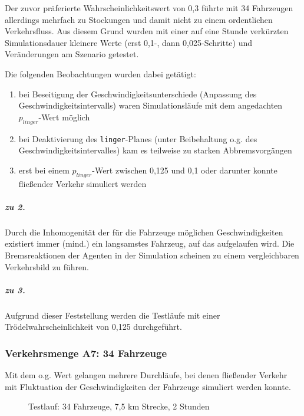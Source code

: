Der zuvor präferierte Wahrscheinlichkeitswert von 0,3 führte mit 34 Fahrzeugen allerdings mehrfach zu Stockungen und damit nicht zu einem ordentlichen Verkehrsfluss.
Aus diesem Grund wurden mit einer auf eine Stunde verkürzten Simulationsdauer kleinere Werte (erst 0,1-, dann 0,025-Schritte) und Veränderungen am Szenario getestet.

Die folgenden Beobachtungen wurden dabei getätigt:
\begin{enumerate}
	\itemsep0em
	\item bei Beseitigung der Geschwindigkeitsunterschiede (Anpassung des Geschwindigkeitsintervalls) waren Simulationsläufe mit dem angedachten $p_{linger}$-Wert möglich
	\item bei Deaktivierung des \texttt{linger}-Planes (unter Beibehaltung o.g. des Geschwindigkeitsintervalles) kam es teilweise zu starken Abbremsvorgängen
	\item erst bei einem $p_{linger}$-Wert zwischen 0,125 und 0,1 oder darunter konnte fließender Verkehr simuliert werden
\end{enumerate}

\subparagraph*{zu 2.} Durch die Inhomogenität der für die Fahrzeuge möglichen Geschwindigkeiten existiert immer (mind.) ein langsamstes Fahrzeug, auf das aufgelaufen wird.
Die Bremsreaktionen der Agenten in der Simulation scheinen zu einem vergleichbaren Verkehrsbild zu führen.

\subparagraph*{zu 3.} Aufgrund dieser Feststellung werden die Testläufe mit einer Trödelwahrscheinlichkeit von 0,125 durchgeführt.



\subsubsection{Verkehrsmenge A7: 34 Fahrzeuge}
\label{sec:szenario-a7}

Mit dem o.g. Wert gelangen mehrere Durchläufe, bei denen fließender Verkehr mit Fluktuation der Geschwindigkeiten der Fahrzeuge simuliert werden konnte.

\begin{figure}[hptb]
  \centering 
   \qquad 
  \caption{Testlauf: 34 Fahrzeuge, 7,5 km Strecke, 2 Stunden} 
  \label{figure:testrun-34veh-7ko5km}
\end{figure}

